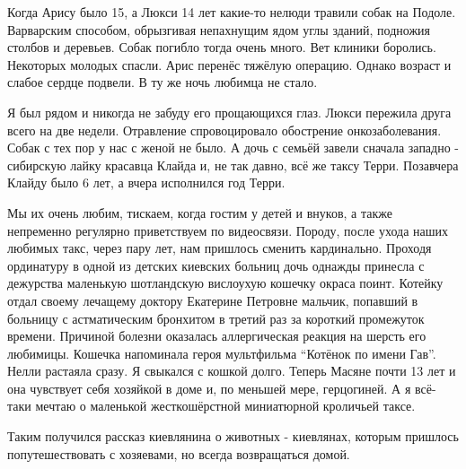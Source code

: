Когда Арису было 15, а Люкси 14 лет какие-то нелюди травили собак на Подоле.
Варварским способом, обрызгивая непахнущим ядом углы зданий, подножия столбов и
деревьев. Собак погибло тогда очень много. Вет клиники боролись. Некоторых
молодых спасли. Арис перенёс тяжёлую операцию. Однако возраст и слабое сердце
подвели. В ту же ночь любимца не стало. 

Я был рядом и никогда не забуду его прощающихся глаз. Люкси пережила друга
всего на две недели. Отравление спровоцировало обострение онкозаболевания.
Собак с тех пор у нас с женой не было. А дочь с семьёй завели сначала западно -
сибирскую лайку красавца Клайда и, не так давно, всё же таксу Терри. Позавчера
Клайду было 6 лет, а вчера исполнился год Терри. 

Мы их очень любим, тискаем, когда гостим у детей и внуков, а также   непременно
регулярно приветствуем по видеосвязи. Породу, после ухода наших любимых такс,
через пару лет, нам пришлось сменить кардинально. Проходя ординатуру в одной из
детских киевских больниц дочь однажды принесла с дежурства маленькую
шотландскую вислоухую кошечку окраса поинт. Котейку отдал своему лечащему
доктору Екатерине Петровне мальчик, попавший в больницу с астматическим
бронхитом в третий раз за короткий промежуток времени. Причиной болезни
оказалась аллергическая реакция на шерсть его любимицы. Кошечка напоминала
героя мультфильма \enquote{Котёнок по имени Гав}.  Нелли растаяла сразу. Я
свыкался с кошкой долго. Теперь Масяне почти 13 лет и она чувствует себя
хозяйкой в доме и, по меньшей мере, герцогиней. А я всё-таки мечтаю о маленькой
жесткошёрстной миниатюрной кроличьей таксе. 

Таким получился рассказ киевлянина о животных - киевлянах, которым пришлось
попутешествовать с хозяевами, но всегда возвращаться домой.

